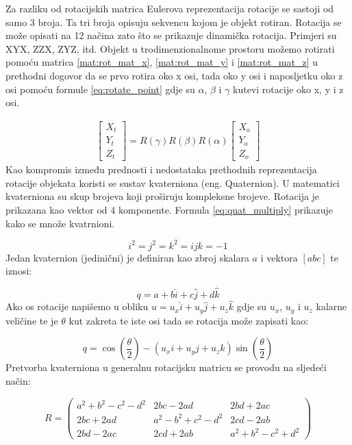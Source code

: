 Za razliku od rotacijskih matrica Eulerova reprezentacija rotacije se sastoji od samo 3 broja. Ta tri broja opisuju sekvencu kojom je objekt rotiran. Rotacija se može opisati na 12 načina zato što se prikazuje dinamička rotacija. Primjeri su XYX, ZZX, ZYZ, itd. Objekt u trodimenzionalnome prostoru možemo rotirati pomoću matrica \ref{mat:rot_mat_x}, \ref{mat:rot_mat_y} i \ref{mat:rot_mat_z} u prethodni dogovor da se prvo rotira oko x osi, tada oko y osi i naposljetku oko z osi pomoću formule \ref{eq:rotate_point} gdje su $\alpha$, $\beta$ i $\gamma$ kutevi rotacije oko x, y i z osi.

\begin{gather}
    \begin{bmatrix} X_{t}\\ Y_{t}\\ Z_{t} \end{bmatrix}
    =
    R(\gamma)R(\beta)R(\alpha)
    \begin{bmatrix} X_{o}\\ Y_{o}\\ Z_{o} \end{bmatrix}
    \label{eq:rotate_point}
\end{gather}
Kao kompromis između prednosti i nedostataka prethodnih reprezentacija rotacije objekata koristi se sustav kvaterniona (eng. Quaternion). U matematici kvaterniona su skup brojeva koji proširuju kompleksne brojeve. Rotacija je prikazana kao vektor od 4 komponente. Formula \ref{eq:quat_multiply} prikazuje kako se množe kvatrnioni.

\begin{equation}
  i^2 = j^2 = k^2 = ijk = -1
  \label{eq:quat_multiply}
\end{equation}
Jedan kvaternion (jedinični) je definiran kao zbroj skalara $a$ i vektora $[a b c]$ te iznosi:

\begin{equation}
  q = a + b\hat{i} + c\hat{j} + d\hat{k}
  \label{eq:jedinicni_vektor}
\end{equation}
Ako os rotacije napišemo u obliku $u=u_{x}\hat{i} + u_{y}\hat{j} + u_{z}\hat{k}$ gdje su $u_{x}$, $u_{y}$ i $u_{z}$ kalarne veličine te je $\theta$ kut zakreta te iste osi tada se rotacija može zapisati kao:

\begin{equation}
  q=\cos(\frac{\theta}{2})-(u_{x}i + u_{y}j + u_{z}k)\sin(\frac{\theta}{2})
\end{equation}
Pretvorba kvaterniona u generalnu rotacijsku matricu se provodu na sljedeći način:

\begin{equation}
R = 
  \begin{pmatrix}
    a^2 + b^2 - c^2 - d^2 & 2bc - 2ad & 2bd + 2ac \\
    2bc + 2ad & a^2 - b^2 + c^2 - d^2 & 2cd - 2ab \\
    2bd - 2ac & 2cd + 2ab & a^2 + b^2 - c^2 + d^2
  \end{pmatrix}
  \label{eq:qvat_to_rot_mat}
\end{equation}